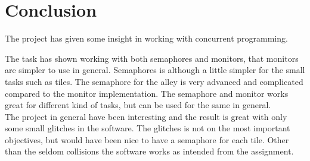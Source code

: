 \section{Conclusion}
The project has given some insight in working with concurrent programming. 

The task has shown working with both semaphores and monitors, that monitors are simpler to use in general. Semaphores is although a little simpler for the small tasks such as tiles. The semaphore for the alley is very advanced and complicated compared to the monitor implementation. The semaphore and monitor works great for different kind of tasks, but can be used for the same in general.
\\

The project in general have been interesting and the result is great with only some small glitches in the software. The glitches is not on the most important objectives, but would have been nice to have a semaphore for each tile. Other than the seldom collisions the software works as intended from the assignment.